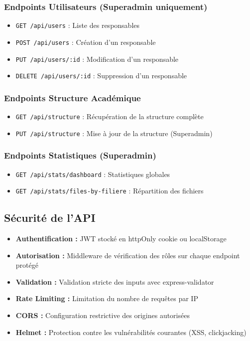 \documentclass[12pt,a4paper]{article}
\begin{document}
\subsubsection{Endpoints Utilisateurs (Superadmin uniquement)}

\begin{itemize}[leftmargin=*]
    \item \texttt{GET /api/users} : Liste des responsables
    \item \texttt{POST /api/users} : Création d'un responsable
    \item \texttt{PUT /api/users/:id} : Modification d'un responsable
    \item \texttt{DELETE /api/users/:id} : Suppression d'un responsable
\end{itemize}

\subsubsection{Endpoints Structure Académique}

\begin{itemize}[leftmargin=*]
    \item \texttt{GET /api/structure} : Récupération de la structure complète
    \item \texttt{PUT /api/structure} : Mise à jour de la structure (Superadmin)
\end{itemize}

\subsubsection{Endpoints Statistiques (Superadmin)}

\begin{itemize}[leftmargin=*]
    \item \texttt{GET /api/stats/dashboard} : Statistiques globales
    \item \texttt{GET /api/stats/files-by-filiere} : Répartition des fichiers
\end{itemize}

\subsection{Sécurité de l'API}

\begin{itemize}[leftmargin=*]
    \item \textbf{Authentification :} JWT stocké en httpOnly cookie ou localStorage
    \item \textbf{Autorisation :} Middleware de vérification des rôles sur chaque endpoint protégé
    \item \textbf{Validation :} Validation stricte des inputs avec express-validator
    \item \textbf{Rate Limiting :} Limitation du nombre de requêtes par IP
    \item \textbf{CORS :} Configuration restrictive des origines autorisées
    \item \textbf{Helmet :} Protection contre les vulnérabilités courantes (XSS, clickjacking)
\end{itemize}
\end{document}
